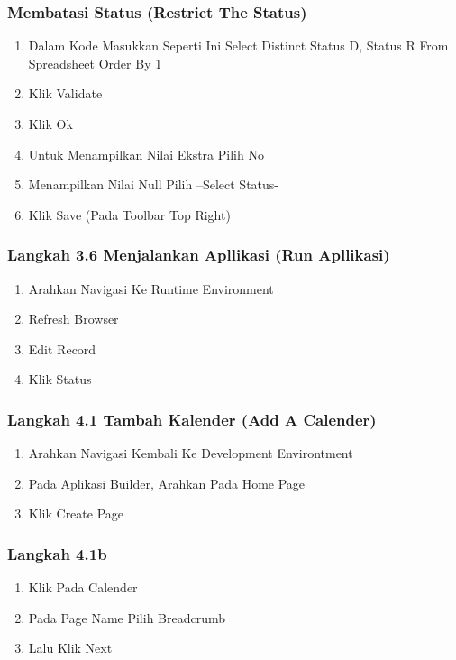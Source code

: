 \documentclass{article}
\begin{document}
\subsubsection{Membatasi Status (Restrict The Status)}
\begin{enumerate}
    \item Dalam Kode Masukkan Seperti Ini
    Select Distinct Status D, Status R From Spreadsheet Order By 1
    \item Klik Validate
    \item Klik Ok
    \item Untuk Menampilkan Nilai Ekstra Pilih No
    \item Menampilkan Nilai Null Pilih –Select Status-
    \item Klik Save (Pada Toolbar Top Right)
    \end{enumerate}
\subsubsection{Langkah 3.6 Menjalankan Apllikasi (Run Apllikasi)}
\begin{enumerate}
    \item Arahkan Navigasi Ke Runtime Environment
    \item Refresh Browser
    \item Edit Record
    \item Klik Status
    \end{enumerate}
\subsubsection{Langkah 4.1 Tambah Kalender (Add A Calender)}
\begin{enumerate}
    \item Arahkan Navigasi Kembali Ke Development Environtment
    \item Pada Aplikasi Builder, Arahkan Pada Home Page
    \item Klik Create Page
    \end{enumerate}
\subsubsection{Langkah 4.1b}
\begin{enumerate}
    \item Klik Pada Calender
    \item Pada Page Name Pilih Breadcrumb
    \item Lalu Klik Next
    \end{enumerate}
\end{document}
